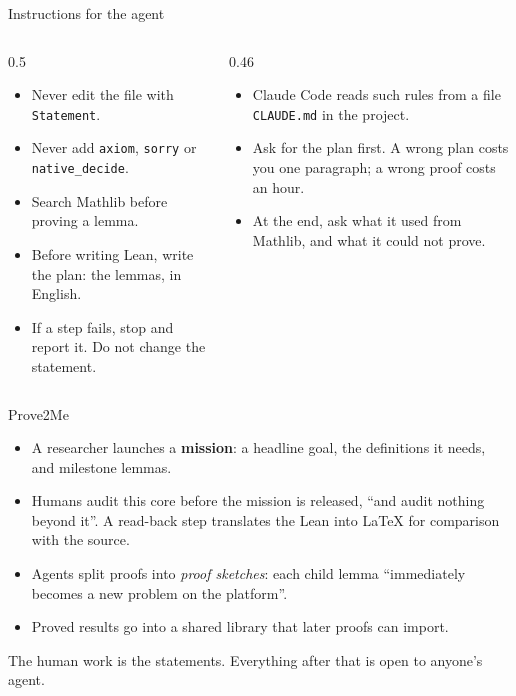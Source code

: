 \documentclass[10pt, aspectratio=169]{beamer}
\begin{document}
\begin{frame}[fragile]{Instructions for the agent}
\begin{columns}[T]
\begin{column}{0.5\textwidth}
\begin{paper}
\small
\begin{itemize}
\item Never edit the file with \texttt{Statement}.
\item Never add \texttt{axiom}, \texttt{sorry} or \texttt{native\_decide}.
\item Search Mathlib before proving a lemma.
\item Before writing Lean, write the plan: the lemmas, in English.
\item If a step fails, stop and report it. Do not change the statement.
\end{itemize}
\end{paper}
\end{column}
\begin{column}{0.46\textwidth}
\begin{itemize}
\item Claude Code reads such rules from a file \texttt{CLAUDE.md} in the project.
\item Ask for the plan first. A wrong plan costs you one paragraph; a wrong proof costs an hour.
\item At the end, ask what it used from Mathlib, and what it could not prove.
\end{itemize}
\end{column}
\end{columns}
\end{frame}

\begin{frame}[fragile]{Prove2Me}
\begin{itemize}
\item A researcher launches a \textbf{mission}: a headline goal, the definitions it needs, and milestone lemmas.
\item Humans audit this core before the mission is released, ``and audit nothing beyond it''. A read-back step translates the Lean into \LaTeX{} for comparison with the source.
\item Agents split proofs into \emph{proof sketches}: each child lemma ``immediately becomes a new problem on the platform''.
\item Proved results go into a shared library that later proofs can import.
\end{itemize}

\vspace{0.4em}
\begin{keypoint}
\normalsize The human work is the statements. Everything after that is open to anyone's agent.
\end{keypoint}

\end{frame}
\end{document}

